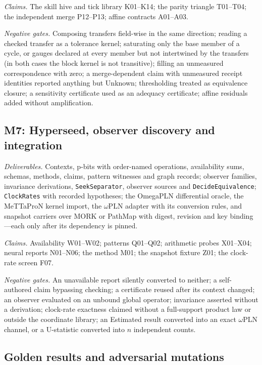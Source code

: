 \documentclass[11pt]{article}
\newcommand{\code}[1]{\texttt{#1}}
\begin{document}
\emph{Claims.} The skill hive and tick library K01--K14; the parity triangle T01--T04; the independent
merge P12--P13; affine contracts A01--A03.

\emph{Negative gates.} Composing transfers field-wise in the same direction; reading a checked
transfer as a tolerance kernel; saturating only the base member of a cycle, or gauges declared at
every member but not intertwined by the transfers (in both cases the block kernel is not
transitive); filling an unmeasured correspondence with zero; a merge-dependent claim with unmeasured
receipt identities reported anything but Unknown; thresholding treated as equivalence closure; a
sensitivity certificate used as an adequacy certificate; affine residuals added without amplification.

\subsection{M7: Hyperseed, observer discovery and integration}

\emph{Deliverables.} Contexts, p-bits with order-named operations, availability sums, schemas, methods,
claims, pattern witnesses and graph records; observer families, invariance derivations,
\code{SeekSeparator}, observer sources and \code{DecideEquivalence}; \code{ClockRates} with recorded
hypotheses; the OmegaPLN differential oracle, the MeTTaProN kernel import, the $\omega$PLN adapter with
its conversion rules, and snapshot carriers over MORK or PathMap with digest, revision and key
binding---each only after its dependency is pinned.

\emph{Claims.} Availability W01--W02; patterns Q01--Q02; arithmetic probes X01--X04; neural reports
N01--N06; the method M01; the snapshot fixture Z01; the clock-rate screen F07.

\emph{Negative gates.} An unavailable report silently converted to neither; a self-authored claim
bypassing checking; a certificate reused after its context changed; an observer evaluated on an unbound
global operator; invariance asserted without a derivation; clock-rate exactness claimed without a
full-support product law or outside the coordinate library; an Estimated result converted into an exact
$\omega$PLN channel, or a U-statistic converted into $n$ independent counts.

\subsection{Golden results and adversarial mutations}\label{sec:golden}
\end{document}
